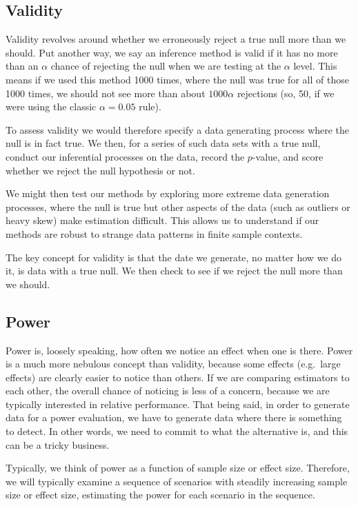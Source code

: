 \documentclass[
]{book}
\begin{document}
\hypertarget{validity}{%
\subsection{Validity}\label{validity}}

Validity revolves around whether we erroneously reject a true null more than we should.
Put another way, we say an inference method is valid if it has no more than an \(\alpha\) chance of rejecting the null when we are testing at the \(\alpha\) level.
This means if we used this method 1000 times, where the null was true for all of those 1000 times, we should not see more than about \(1000 \alpha\) rejections (so, 50, if we were using the classic \(\alpha = 0.05\) rule).

To assess validity we would therefore specify a data generating process where the null is in fact true.
We then, for a series of such data sets with a true null, conduct our inferential processes on the data, record the \(p\)-value, and score whether we reject the null hypothesis or not.

We might then test our methods by exploring more extreme data generation processes, where the null is true but other aspects of the data (such as outliers or heavy skew) make estimation difficult.
This allows us to understand if our methods are robust to strange data patterns in finite sample contexts.

The key concept for validity is that the date we generate, no matter how we do it, is data with a true null.
We then check to see if we reject the null more than we should.

\hypertarget{power}{%
\subsection{Power}\label{power}}

Power is, loosely speaking, how often we notice an effect when one is there.
Power is a much more nebulous concept than validity, because some effects (e.g.~large effects) are clearly easier to notice than others.
If we are comparing estimators to each other, the overall chance of noticing is less of a concern, because we are typically interested in relative performance.
That being said, in order to generate data for a power evaluation, we have to generate data where there is something to detect.
In other words, we need to commit to what the alternative is, and this can be a tricky business.

Typically, we think of power as a function of sample size or effect size. Therefore, we will typically examine a sequence of scenarios with steadily increasing sample size or effect size, estimating the power for each scenario in the sequence.
\end{document}
